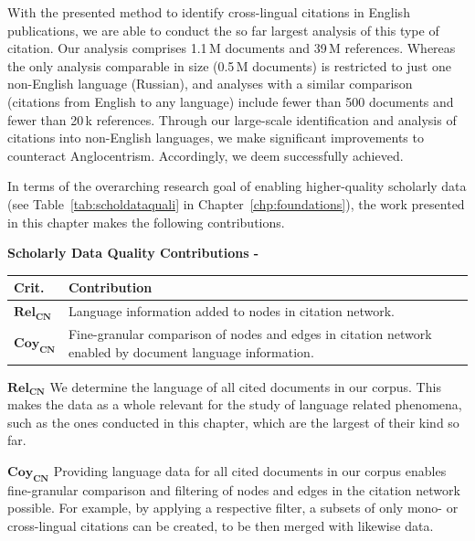 With the presented method to identify cross-lingual citations in English publications, we are able to conduct the so far largest analysis of this type of citation. Our analysis comprises 1.1\,M documents and 39\,M references. Whereas the only analysis comparable in size (0.5\,M documents) is restricted to just one non-English language (Russian), and analyses with a similar comparison (citations from English to any language) include fewer than 500 documents and fewer than 20\,k references. Through our large-scale identification and analysis of citations into non-English languages, we make significant improvements to counteract Anglocentrism. Accordingly, we deem  successfully achieved.

In terms of the overarching research goal of enabling higher-quality scholarly data (see Table~\ref{tab:scholdataquali} in Chapter~\ref{chp:foundations}), the work presented in this chapter makes the following contributions.

\begin{infobox-progress}
      \textbf{Scholarly Data Quality Contributions - \cite{Saier2020xling,Saier2021}}\vspace{0.5em}

      \begin{tabular}{lp{10.9cm}}
        \toprule
        Crit. & Contribution \\
        \midrule
        $\mathbf{Rel_{CN}}$ & Language information added to nodes in citation network. \\
        $\mathbf{Coy_{CN}}$ & Fine-granular comparison of nodes and edges in citation network enabled by document language information. \\
        \bottomrule
      \end{tabular}
\end{infobox-progress}

$\mathbf{Rel_{CN}}$ We determine the language of all cited documents in our corpus. This makes the data as a whole relevant for the study of language related phenomena, such as the ones conducted in this chapter, which are the largest of their kind so far.

$\mathbf{Coy_{CN}}$ Providing language data for all cited documents in our corpus enables fine-granular comparison and filtering of nodes and edges in the citation network possible. For example, by applying a respective filter, a subsets of only mono- or cross-lingual citations can be created, to be then merged with likewise data.

